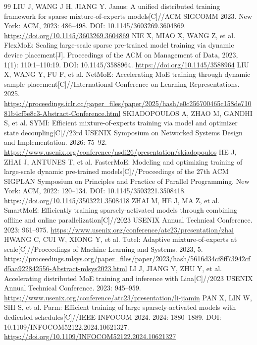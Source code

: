 \renewcommand{\refname}{参考文献}
\begin{thebibliography}{99}
 LIU J, WANG J H, JIANG Y. Janus: A unified distributed training framework for sparse mixture-of-experts models[C]//ACM SIGCOMM 2023. New York: ACM, 2023: 486--498. DOI: 10.1145/3603269.3604869. \url{https://doi.org/10.1145/3603269.3604869}
 NIE X, MIAO X, WANG Z, et al. FlexMoE: Scaling large-scale sparse pre-trained model training via dynamic device placement[J]. Proceedings of the ACM on Management of Data, 2023, 1(1): 110:1--110:19. DOI: 10.1145/3588964. \url{https://doi.org/10.1145/3588964}
 LIU X, WANG Y, FU F, et al. NetMoE: Accelerating MoE training through dynamic sample placement[C]//International Conference on Learning Representations. 2025. \url{https://proceedings.iclr.cc/paper_files/paper/2025/hash/e0c256700465c158de71081b4cf5e8c3-Abstract-Conference.html}
 SKIADOPOULOS A, ZHAO M, GANDHI S, et al. SYMI: Efficient mixture-of-experts training via model and optimizer state decoupling[C]//23rd USENIX Symposium on Networked Systems Design and Implementation. 2026: 75--92. \url{https://www.usenix.org/conference/nsdi26/presentation/skiadopoulos}
 HE J, ZHAI J, ANTUNES T, et al. FasterMoE: Modeling and optimizing training of large-scale dynamic pre-trained models[C]//Proceedings of the 27th ACM SIGPLAN Symposium on Principles and Practice of Parallel Programming. New York: ACM, 2022: 120--134. DOI: 10.1145/3503221.3508418. \url{https://doi.org/10.1145/3503221.3508418}
 ZHAI M, HE J, MA Z, et al. SmartMoE: Efficiently training sparsely-activated models through combining offline and online parallelization[C]//2023 USENIX Annual Technical Conference. 2023: 961--975. \url{https://www.usenix.org/conference/atc23/presentation/zhai}
 HWANG C, CUI W, XIONG Y, et al. Tutel: Adaptive mixture-of-experts at scale[C]//Proceedings of Machine Learning and Systems. 2023, 5. \url{https://proceedings.mlsys.org/paper_files/paper/2023/hash/5616d34cf8ff73942cfd5aa922842556-Abstract-mlsys2023.html}
 LI J, JIANG Y, ZHU Y, et al. Accelerating distributed MoE training and inference with Lina[C]//2023 USENIX Annual Technical Conference. 2023: 945--959. \url{https://www.usenix.org/conference/atc23/presentation/li-jiamin}
 PAN X, LIN W, SHI S, et al. Parm: Efficient training of large sparsely-activated models with dedicated schedules[C]//IEEE INFOCOM 2024. 2024: 1880--1889. DOI: 10.1109/INFOCOM52122.2024.10621327. \url{https://doi.org/10.1109/INFOCOM52122.2024.10621327}
\end{thebibliography}
